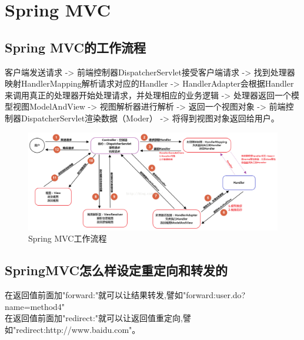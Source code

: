 \documentclass[main.tex]{subfiles}
\begin{document}
\section{Spring MVC}
\subsection{Spring MVC的工作流程}
客户端发送请求 -> 前端控制器DispatcherServlet接受客户端请求 -> 找到处理器映射HandlerMapping解析请求对应的Handler -> HandlerAdapter会根据Handler来调用真正的处理器开始处理请求，并处理相应的业务逻辑 -> 处理器返回一个模型视图ModelAndView -> 视图解析器进行解析 -> 返回一个视图对象 -> 前端控制器DispatcherServlet渲染数据（Moder） -> 将得到视图对象返回给用户。
\begin{figure}[H]
    \centering
    \includegraphics[scale=0.65]{./images/0016.png}
    \caption{Spring MVC工作流程}
\end{figure}
\subsection{SpringMVC怎么样设定重定向和转发的}
在返回值前面加"forward:"就可以让结果转发,譬如"forward:user.do?name=method4"\\
在返回值前面加"redirect:"就可以让返回值重定向,譬如"redirect:http://www.baidu.com"。
\end{document}
